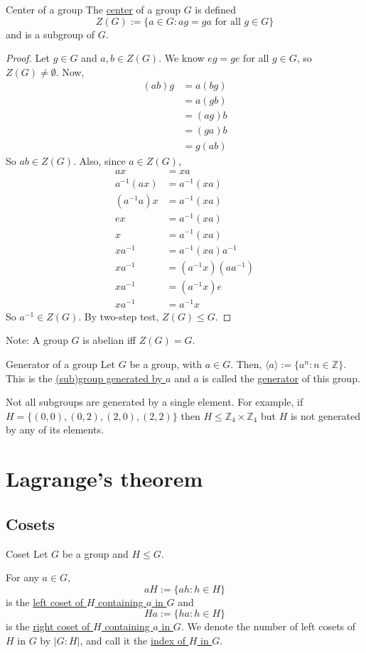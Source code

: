 \documentclass[12pt]{article}
\newcommand{\Z}{\mathbb{Z}}
\newcommand{\inv}{^{-1}}
\begin{document}
	\begin{myex}{Center of a group}{}
		The \underline{center} of a group $G$ is defined $$Z(G):=\{a\in G:ag=ga\text{ for all }g\in G\}$$
		and is a subgroup of $G$.
		\begin{proof}
			Let $g\in G$ and $a, b\in Z(G)$. We know $eg=ge$ for all $g\in G$, so $Z(G)\neq\emptyset$. Now,
			\begin{align*}
				(ab)g&=a(bg)\\
				&=a(gb)\\
				&=(ag)b\\
				&=(ga)b\\
				&=g(ab)
			\end{align*}
			So $ab\in Z(G)$. Also, since $a\in Z(G)$,
			\begin{align*}
				ax&=xa\\
				a\inv(ax)&=a\inv(xa)\\
				(a\inv a)x&=a\inv(xa)\\
				ex&=a\inv(xa)\\
				x&=a\inv(xa)\\
				xa\inv&=a\inv(xa)a\inv\\
				xa\inv&=(a\inv x)(aa\inv)\\
				xa\inv&=(a\inv x)e\\
				xa\inv&=a\inv x
			\end{align*}
			So $a\inv\in Z(G)$. By two-step test, $Z(G)\leq G$.
		\end{proof}
		
		Note: A group $G$ is abelian iff $Z(G)=G$.
	\end{myex}
	
	\begin{mydef}{Generator of a group}{}
		Let $G$ be a group, with $a\in G$. Then, $\langle a\rangle:=\{a^n:n\in\Z\}$. This is the \underline{(sub)group generated by $a$} and $a$ is called the \underline{generator} of this group.
	\end{mydef}
	
	\begin{myrem}{}{}
		Not all subgroups are generated by a single element. For example, if $H=\{(0, 0), (0, 2), (2, 0), (2, 2)\}$ then $H\leq\Z_4\times\Z_4$ but $H$ is not generated by any of its elements.
	\end{myrem}
	
	\section{Lagrange's theorem}	
	\subsection{Cosets}
	\begin{mydef}{Coset}{}
		Let $G$ be a group and $H\leq G$.
		
		For any $a\in G$, $$aH:=\{ah:h\in H\}$$ is the \underline{left coset of $H$ containing $a$ in $G$} and $$Ha:=\{ha:h\in H\}$$ is the \underline{right coset of $H$ containing $a$ in $G$}. We denote the number of left cosets of $H$ in $G$ by $|G:H|$, and call it the \underline{index of $H$ in $G$}.
	\end{mydef}
	
\end{document}
